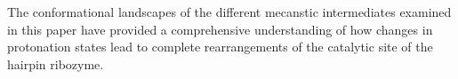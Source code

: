 \documentclass[journal=jacsat,manuscript=article]{achemso}
\begin{document}
The conformational landscapes of the different mecanstic intermediates examined in this paper have provided a comprehensive understanding of how changes in protonation states lead to complete rearrangements of the catalytic site of the hairpin ribozyme. 





\end{document}

